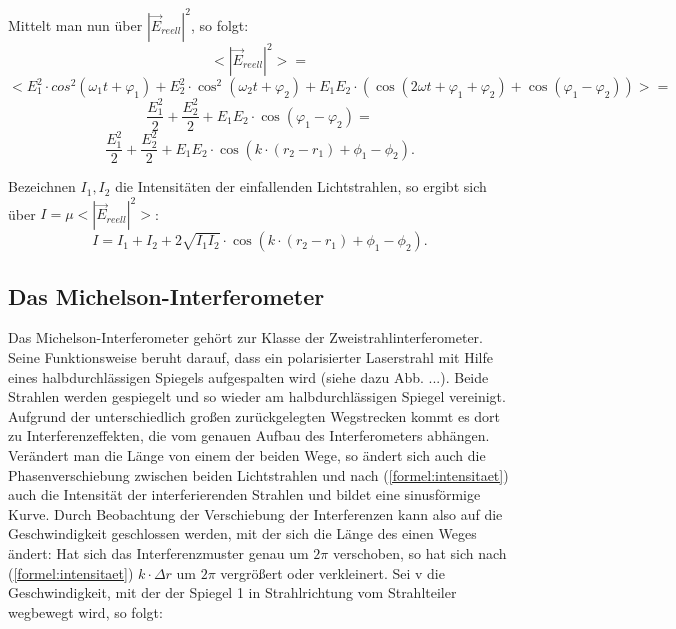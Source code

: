 Mittelt man nun über $ | \vec{E}_{reell} |^{2} $, so folgt: 
\begin{equation}
\nonumber
<| \vec{E}_{reell} |^{2}> = 
\end{equation}
\begin{equation}
\nonumber
< E_{1}^{2} \cdot cos^{2}(\omega_{1}t + \varphi_{1}) + E_{2}^{2} \cdot \cos^{2}(\omega_{2}t + \varphi_{2}) + E_{1}E_{2} \cdot (\cos(2\omega t + \varphi_{1} + \varphi_{2}) + \cos(\varphi_{1} - \varphi_{2})) > = 
\end{equation}
\begin{equation}
\nonumber
\frac{E_{1}^{2}}{2} + \frac{E_{2}^{2}}{2} + E_{1}E_{2} \cdot \cos(\varphi_{1} - \varphi_{2}) = 
\end{equation}
\begin{equation}
\frac{E_{1}^{2}}{2} + \frac{E_{2}^{2}}{2} + E_{1}E_{2} \cdot \cos( k \cdot (r_{2} - r_{1}) + \phi_{1} - \phi_{2}).
\end{equation}

Bezeichnen $ I_{1}, I_{2} $ die Intensitäten der einfallenden Lichtstrahlen, so ergibt sich über $ I = \mu <|\vec{E}_{reell}|^{2}> $: 
\begin{equation}
\label{formel:intensitaet}
I = I_{1} + I_{2} + 2 \sqrt{I_{1} I_{2}} \cdot \cos( k \cdot (r_{2} - r_{1}) + \phi_{1} - \phi_{2}).
\end{equation}





\subsection{Das Michelson-Interferometer}

Das Michelson-Interferometer gehört zur Klasse der Zweistrahlinterferometer. Seine Funktionsweise beruht darauf, dass ein polarisierter Laserstrahl mit Hilfe eines halbdurchlässigen Spiegels aufgespalten wird (siehe dazu Abb. ...). Beide Strahlen werden gespiegelt und so wieder am halbdurchlässigen Spiegel vereinigt. Aufgrund der unterschiedlich großen zurückgelegten Wegstrecken kommt es dort zu Interferenzeffekten, die vom genauen Aufbau des Interferometers abhängen.\\
Verändert man die Länge von einem der beiden Wege, so ändert sich auch die Phasenverschiebung zwischen beiden Lichtstrahlen und nach (\ref{formel:intensitaet}) auch die Intensität der interferierenden Strahlen und bildet eine sinusförmige Kurve. Durch Beobachtung der Verschiebung der Interferenzen kann also auf die Geschwindigkeit geschlossen werden, mit der sich die Länge des einen Weges ändert: 
Hat sich das Interferenzmuster genau um $ 2 \pi $ verschoben, so hat sich nach (\ref{formel:intensitaet}) $ k \cdot \Delta r $ um $ 2 \pi $ vergrößert oder verkleinert. 
Sei v die Geschwindigkeit, mit der der Spiegel 1 in Strahlrichtung vom Strahlteiler wegbewegt wird, so folgt: 

